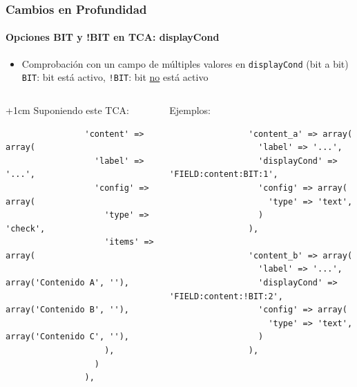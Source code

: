 
\begin{frame}[fragile]
	\frametitle{Cambios en Profundidad}
	\framesubtitle{Opciones BIT y !BIT en TCA: displayCond}

	\lstset{
		basicstyle=\tiny\ttfamily
	}

	\begin{itemize}
		\item Comprobación con un campo de múltiples valores en \texttt{displayCond} (bit a bit)\newline
			\texttt{BIT}: bit está activo, \texttt{!BIT}: bit \underline{no} está activo
	\end{itemize}

	\begin{columns}[T]

		\begin{column}{.5\textwidth}

			\advance\leftskip+1cm
			Suponiendo este TCA:

			\lstset{xleftmargin=1cm}

			\begin{lstlisting}
				'content' => array(
				  'label' => '...',
				  'config' => array(
				    'type' => 'check',
				    'items' => array(
				      array('Contenido A', ''),
				      array('Contenido B', ''),
				      array('Contenido C', ''),
				    ),
				  )
				),
			\end{lstlisting}

		\end{column}
		\begin{column}{.5\textwidth}

			Ejemplos:

			\begin{lstlisting}
				'content_a' => array(
				  'label' => '...',
				  'displayCond' => 'FIELD:content:BIT:1',
				  'config' => array(
				    'type' => 'text',
				  )
				),

				'content_b' => array(
				  'label' => '...',
				  'displayCond' => 'FIELD:content:!BIT:2',
				  'config' => array(
				    'type' => 'text',
				  )
				),
			\end{lstlisting}
		\end{column}

	\end{columns}

\end{frame}

